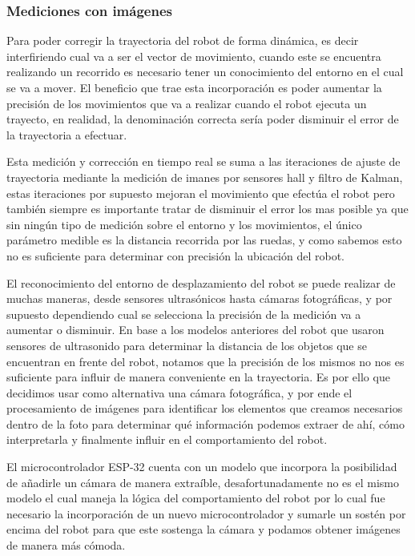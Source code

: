 \subsubsection{Mediciones con imágenes}

Para poder corregir la trayectoria del robot de forma dinámica, es decir interfiriendo cual va a ser el vector de movimiento, cuando este se encuentra realizando un recorrido es necesario tener un conocimiento del entorno en el cual se va a mover. El beneficio que trae esta incorporación es poder aumentar la precisión de los movimientos que va a realizar cuando el robot ejecuta un trayecto, en realidad, la denominación correcta sería poder disminuir el error de la trayectoria a efectuar.

Esta medición y corrección en tiempo real se suma a las iteraciones de ajuste de trayectoria mediante la medición de imanes por sensores hall y filtro de Kalman, estas iteraciones por supuesto mejoran el movimiento que efectúa el robot pero también siempre es importante tratar de disminuir el error los mas posible ya que sin ningún tipo de medición sobre el entorno y los movimientos, el único parámetro medible es la distancia recorrida por las ruedas, y como sabemos esto no es suficiente para determinar con precisión la ubicación del robot.

El reconocimiento del entorno de desplazamiento del robot se puede realizar de muchas maneras, desde sensores ultrasónicos hasta cámaras fotográficas, y por supuesto dependiendo cual se selecciona la precisión de la medición va a aumentar o disminuir.
En base a los modelos anteriores del robot que usaron sensores de ultrasonido para determinar la distancia de los objetos que se encuentran en frente del robot, notamos que la precisión de los mismos no nos es suficiente para influir de manera conveniente en la trayectoria. Es por ello que decidimos usar como alternativa una cámara fotográfica, y por ende el procesamiento de imágenes para identificar los elementos que creamos necesarios dentro de la foto para determinar qué información podemos extraer de ahí, cómo interpretarla y finalmente influir en el comportamiento del robot.

El microcontrolador ESP-32 cuenta con un modelo que incorpora la posibilidad de añadirle un cámara de manera extraíble, desafortunadamente no es el mismo modelo el cual maneja la lógica del comportamiento del robot por lo cual fue necesario la incorporación de un nuevo microcontrolador y sumarle un sostén por encima del robot para que este sostenga la cámara y podamos obtener imágenes de manera más cómoda.

